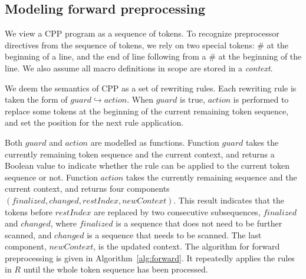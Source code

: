 \subsection{Modeling forward preprocessing}\label{sec:forward}
We view a CPP program as a sequence of tokens. To
recognize preprocessor directives from the sequence of tokens, %
we rely on two special tokens: \# at the
beginning of a line, and the end of line
following from a \# at the beginning of the line. We also assume  all
macro definitions in scope are stored in a \emph{context}.

We deem the semantics of CPP as a set of rewriting rules.
Each rewriting rule is taken the form of
$guard \hookrightarrow action$. When $guard$ is true, $action$ is
performed to replace some tokens at the beginning of the current
remaining token sequence, and set the position for the next rule
application.

Both $guard$ and $action$ are modelled as functions. Function $guard$
takes the currently remaining token sequence and the current context,
and returns a Boolean value to indicate whether the rule can be
applied to the current token sequence or not. Function $action$ takes
the currently remaining sequence and the current context, and returns
four components $(finalized, changed, restIndex, newContext)$. %
This result indicates that the tokens before $restIndex$ are replaced %
by
two consecutive subsequences, $finalized$ and $changed$, where $finalized$ is a sequence
that does not need to be further scanned, and $changed$ is a sequence
that needs to be scanned. The last component, $newContext$, is the updated
context.
The algorithm for forward preprocessing is given in
Algorithm~\ref{alg:forward}. It repeatedly applies the
rules in $R$ until the whole token sequence has been processed.

